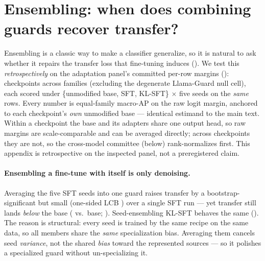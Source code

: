 \section{Ensembling: when does combining guards recover transfer?}
\label{app:ensembling}

Ensembling is a classic way to make a classifier generalize, so it is natural to ask whether it repairs
the transfer loss that fine-tuning induces (). We test this \emph{retrospectively} on the
adaptation panel's committed per-row margins (): \EnsNCk{} checkpoints across \EnsNFam{}
families (excluding the degenerate Llama-Guard null cell), each scored under \{unmodified base, SFT,
KL-SFT\} $\times$ five seeds on the \emph{same} rows. Every number is equal-family macro-AP on the raw
logit margin, anchored to each checkpoint's \emph{own} unmodified base --- identical estimand to the main
text. Within a checkpoint the base and its adapters share one output head, so raw margins are
scale-comparable and can be averaged directly; across checkpoints they are not, so the cross-model
committee (below) rank-normalizes first. This appendix is retrospective on the inspected panel, not a
preregistered claim.

\paragraph{Ensembling a fine-tune with itself is only denoising.} Averaging the five SFT seeds into one
guard raises transfer by a bootstrap-significant but small \EnsSeedGainTrans{} (one-sided LCB
\EnsSeedGainTransLCB{}) over a single SFT run --- yet transfer still lands \emph{below} the base
(\EnsSeedSFTdTrans{} vs.\ base; ). Seed-ensembling KL-SFT behaves the same
(\EnsSeedKLdTrans{}). The reason is structural: every seed is trained by the same recipe on the same data,
so all members share the \emph{same} specialization bias. Averaging them cancels seed \emph{variance}, not
the shared \emph{bias} toward the represented sources --- so it polishes a specialized guard without
un-specializing it.

